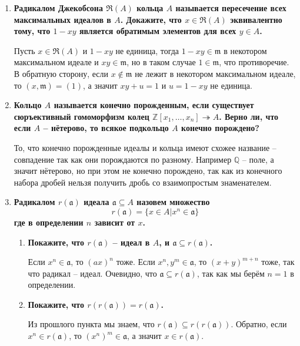 \documentclass{article}
\begin{document}
\begin{enumerate}
    \item \textbf{Радикалом Джекобсона $\mathfrak{R}(A)$ кольца $A$ называется
        пересечение всех максимальных идеалов в $A$. Докажите, что
        $x\in\mathfrak{R}(A)$ эквивалентно тому, что $1 − xy$ является
        обратимым элементов для всех $y\in A$.}
        
        Пусть $x\in\mathfrak{R}(A)$ и $1-xy$ не единица, тогда $1-xy\in\mathfrak{m}$
        в некотором максимальном идеале и $xy\in\mathfrak{m}$, но в таком
        случае $1\in\mathfrak{m}$, что противоречие. В обратную сторону, если
        $x\notin\mathfrak{m}$ не лежит в некотором максимальном идеале, то
        $(x,\mathfrak{m})=(1)$, а значит $xy+u=1$ и $u=1-xy$ не единица.

    \item \textbf{Кольцо $A$ называется конечно порожденным, если существует
        сюръективный гомоморфизм колец $\mathbb{Z}[x_1,\ldots,x_n]\twoheadrightarrow A$.
        Верно ли, что если $A$ – нётерово, то всякое подкольцо $A$ конечно
        порождено?}

        То, что конечно порожденные идеалы и кольца имеют схожее название –
        совпадение так как они порождаются по разному. Например $\mathbb{Q}$ –
        поле, а значит нётерово, но при этом не конечно порождено, так как
        из конечного набора дробей нельзя получить дробь со взаимопростым
        знаменателем.

    \item \textbf{Радикалом $r(\mathfrak{a})$ идеала $\mathfrak{a}\subseteq A$
        назовем множество
        \[ r(\mathfrak{a})=\{x\in A| x^n\in\mathfrak{a}\}\]
        где в определении $n$ зависит от $x$.}
        \begin{enumerate}
            \item \textbf{Покажите, что $r(\mathfrak{a})$ – идеал в $A$, и $\mathfrak{a}
                \subseteq r(\mathfrak{a})$.}

                Если $x^n\in\mathfrak{a}$, то $(ax)^n$ тоже. Если $x^n,y^m\in
                \mathfrak{a}$, то $(x+y)^{m+n}$ тоже, так что радикал – идеал.
                Очевидно, что $\mathfrak{a}\subseteq r(\mathfrak{a})$, так как
                мы берём $n=1$ в определении.

            \item \textbf{Покажите, что $r(r(\mathfrak{a}))=r(\mathfrak{a})$.}

                Из прошлого пункта мы знаем, что $r(\mathfrak{a})\subseteq
                r(r(\mathfrak{a}))$. Обратно, если $x^n\in r(\mathfrak{a})$,
                то $(x^n)^m\in \mathfrak{a}$, а значит $x\in r(\mathfrak{a})$.


\end{enumerate}
\end{enumerate}
\end{document}

